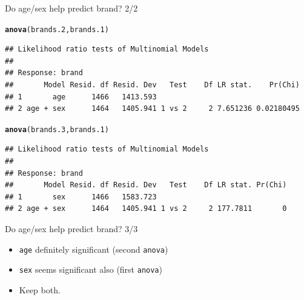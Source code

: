\documentclass[unknownkeysallowed]{beamer}\usepackage[]{graphicx}\usepackage[]{color}
\makeatletter
\newcommand{\hlstd}[1]{\textcolor[rgb]{0.345,0.345,0.345}{#1}}%
\newcommand{\hlkwd}[1]{\textcolor[rgb]{0.737,0.353,0.396}{\textbf{#1}}}%
\newenvironment{kframe}{%
 \def\at@end@of@kframe{}%
 \ifinner\ifhmode%
  \def\at@end@of@kframe{\end{minipage}}%
  \begin{minipage}{\columnwidth}%
 \fi\fi%
 \def\FrameCommand##1{\hskip\@totalleftmargin \hskip-\fboxsep
 \colorbox{shadecolor}{##1}\hskip-\fboxsep
     \hskip-\linewidth \hskip-\@totalleftmargin \hskip\columnwidth}%
 \MakeFramed {\advance\hsize-\width
   \@totalleftmargin\z@ \linewidth\hsize
   \@setminipage}}%
 {\par\unskip\endMakeFramed%
 \at@end@of@kframe}
\newenvironment{knitrout}{}{} %
\makeatother
\begin{document}
\begin{frame}[fragile]{Do age/sex help predict brand? 2/2}

 
\begin{knitrout}\scriptsize
{}\color{fgcolor}\begin{kframe}
\begin{alltt}
\hlkwd{anova}\hlstd{(brands.2,brands.1)}
\end{alltt}
\begin{verbatim}
## Likelihood ratio tests of Multinomial Models
## 
## Response: brand
##       Model Resid. df Resid. Dev   Test    Df LR stat.    Pr(Chi)
## 1       age      1466   1413.593                                 
## 2 age + sex      1464   1405.941 1 vs 2     2 7.651236 0.02180495
\end{verbatim}
\begin{alltt}
\hlkwd{anova}\hlstd{(brands.3,brands.1)}
\end{alltt}
\begin{verbatim}
## Likelihood ratio tests of Multinomial Models
## 
## Response: brand
##       Model Resid. df Resid. Dev   Test    Df LR stat. Pr(Chi)
## 1       sex      1466   1583.723                              
## 2 age + sex      1464   1405.941 1 vs 2     2 177.7811       0
\end{verbatim}
\end{kframe}
\end{knitrout}
  
  
  
\end{frame}

\begin{frame}[fragile]{Do age/sex help predict brand? 3/3}

  \begin{itemize}
\item \texttt{age} definitely significant (second \texttt{anova})
\item \texttt{sex} seems significant also (first \texttt{anova})
\item Keep both.
\end{itemize}

\end{frame}
\end{document}
